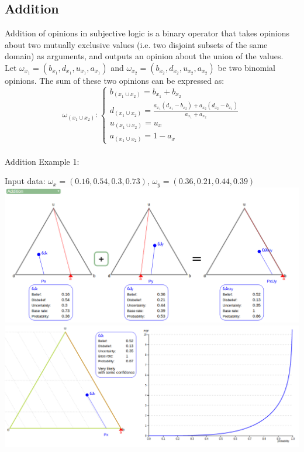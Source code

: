 \documentclass[UTF8]{article}
\newcommand{\opinion}[5]{$\omega_{#1} = (#2, #3, #4, #5)$}
\begin{document}
\subsection{Addition}
Addition of opinions in subjective logic is a binary operator that takes opinions
about two mutually exclusive values (i.e. two disjoint subsets of the same domain)
as arguments, and outputs an opinion about the union of the values.\\
Let \opinion{x_1}{b_{x_1}}{d_{x_1}}{u_{x_1}}{a_{x_1}} and \opinion{x_2}{b_{x_2}}{d_{x_2}}{u_{x_2}}{a_{x_2}} be two binomial opinions. The sum of these two opinions can be expressed as:
$$
\omega_{(x_1 \cup x_2)}: 
\begin{cases}
    b_{(x_1 \cup x_2)} = b_{x_1} + b_{x_2}\\    
    d_{(x_1 \cup x_2)} = \frac{a_{x_1}(d_{x_1} - b_{x_2}) + a_{x_2}(d_{x_2} - b_{x_1})}{a_{x_1} + a_{x_2}}\\
    u_{(x_1 \cup x_2)} = u_x\\
    a_{(x_1 \cup x_2)} = 1 - a_x
\end{cases}
$$\\
Addition Example 1:\\
\begin{center}
    Input data: 
    \opinion{x}{0.16}{0.54}{0.3}{0.73}, 
    \opinion{y}{0.36}{0.21}{0.44}{0.39}\\
    \includegraphics[width=6in]{images/add1.png}
    \includegraphics[width=6in]{images/add1viz.png}
\end{center}
\end{document}
